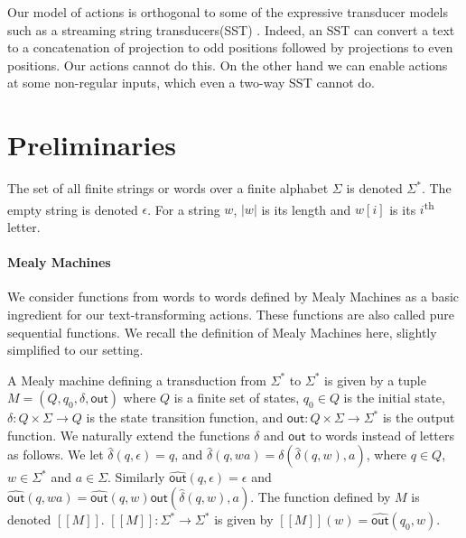 \documentclass[12pt, a4paper]{article}
\newcommand{\alphabet}{\Sigma}
\newcommand{\mm}{M}
\newcommand{\mmstate}{Q}
\newcommand{\mminitial}{q_0}
\newcommand{\mmtrans}{\delta}
\newcommand{\mmout}{\textsf{out}}
\newcommand{\fmm}[1]{[\![#1]\!]}
\newcommand{\mmtransstar}{\widehat{\mmtrans}}
\newcommand{\mmoutstar}{\widehat{\mmout}}
\begin{document}
Our model of actions is orthogonal to some of the expressive transducer models such as a streaming string transducers(SST) \cite{A2011}. Indeed, an SST can convert a text to a concatenation of projection to odd positions followed by projections to even positions. Our actions cannot do this. On the other hand we can enable actions at some non-regular inputs, which even a two-way SST cannot do. 



\section{Preliminaries}

The set of all finite strings or words over a finite alphabet $\alphabet$ is denoted $\alphabet^\ast$. The empty string is denoted $\epsilon$. For a string $w$, $|w|$ is its length and $w[i]$ is its $i$\textsuperscript{th} letter.

\paragraph*{Mealy Machines} We consider functions from words to words defined by Mealy Machines as a basic ingredient for our text-transforming actions. These functions are also called pure sequential functions. We recall the definition of Mealy Machines here, slightly simplified to our setting. 

A Mealy machine defining a transduction from $\Sigma^\ast$ to $\Sigma^\ast$ is given by a tuple $\mm = (\mmstate, \mminitial, \mmtrans, \mmout)$ where $\mmstate$ is a finite set of states, $\mminitial \in \mmstate$ is the initial state, $\mmtrans : \mmstate \times \alphabet \to \mmstate$ is the state transition function, and $\mmout : \mmstate \times \alphabet \to \alphabet^\ast$ is the output function.
%
We naturally extend the functions $\mmtrans$ and $\mmout$ to words instead of letters as follows. We let $\mmtransstar(q,\epsilon) = q$, and  $\mmtransstar(q, wa) = \mmtrans(\mmtransstar(q,w), a)$, where $q \in \mmstate$, $w \in \alphabet^\ast$ and $a \in \alphabet$. Similarly $\mmoutstar(q,\epsilon) = \epsilon$ and $\mmoutstar(q,wa) = \mmoutstar(q,w)\mmout(\mmtransstar(q,w),a)$.
%
 The function defined by $\mm$ is denoted $\fmm{\mm}$. $\fmm{\mm}: \alphabet^\ast \to \alphabet^\ast$ is given by $\fmm{\mm}(w) = \mmoutstar(\mminitial, w)$.
\end{document}
